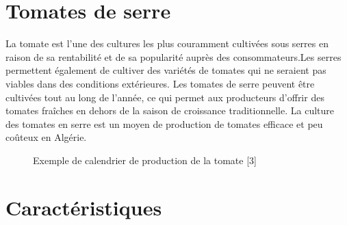 \section{Tomates de serre }
La tomate est l'une des cultures les plus couramment cultivées sous serres en raison de sa rentabilité et de sa popularité auprès des consommateurs.Les serres permettent également de cultiver des variétés de tomates qui ne seraient pas viables dans des conditions extérieures. Les tomates de serre peuvent être cultivées tout au long de l'année, ce qui permet aux producteurs d'offrir des tomates fraîches en dehors de la saison de croissance traditionnelle.
La culture des tomates en serre est un moyen de production de tomates efficace et peu
coûteux en Algérie.
\begin{figure}[!h]
\centering
	  \label{figures:Exemple de calendrier de production de la tomate} 
	    \caption{Exemple de calendrier de production de la tomate [3]}
\end{figure}

\pagebreak

\section{Caractéristiques}

